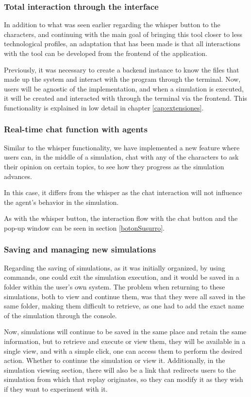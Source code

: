 \subsubsection{Total interaction through the interface}
In addition to what was seen earlier regarding the whisper button to the characters, and continuing with the main goal of bringing this tool closer to less technological profiles, an adaptation that has been made is that all interactions with the tool can be developed from the frontend of the application.

Previously, it was necessary to create a backend instance to know the files that made up the system and interact with the program through the terminal. Now, users will be agnostic of the implementation, and when a simulation is executed, it will be created and interacted with through the terminal via the frontend. This functionality is explained in low detail in chapter \ref{cap:extensiones}.

\subsubsection{Real-time chat function with agents}
Similar to the whisper functionality, we have implemented a new feature where users can, in the middle of a simulation, chat with any of the characters to ask their opinion on certain topics, to see how they progress as the simulation advances.

In this case, it differs from the whisper as the chat interaction will not influence the agent's behavior in the simulation.

As with the whisper button, the interaction flow with the chat button and the pop-up window can be seen in section \ref{botonSusurro}.

\subsubsection{Saving and managing new simulations}

Regarding the saving of simulations, as it was initially organized, by using commands, one could exit the simulation execution, and it would be saved in a folder within the user's own system. The problem when returning to these simulations, both to view and continue them, was that they were all saved in the same folder, making them difficult to retrieve, as one had to add the exact name of the simulation through the console.

Now, simulations will continue to be saved in the same place and retain the same information, but to retrieve and execute or view them, they will be available in a single view, and with a simple click, one can access them to perform the desired action. Whether to continue the simulation or view it. Additionally, in the simulation viewing section, there will also be a link that redirects users to the simulation from which that replay originates, so they can modify it as they wish if they want to experiment with it.

